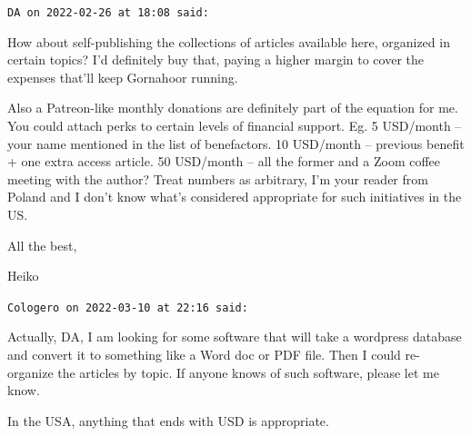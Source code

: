 \begin{footnotesize}
\begin{sffamily}
\hfill

\texttt{DA on 2022-02-26 at 18:08 said:}

How about self-publishing the collections of articles available here, organized in certain topics? I'd definitely buy that, paying a higher margin to cover the expenses that'll keep Gornahoor running.

Also a Patreon-like monthly donations are definitely part of the equation for me. You could attach perks to certain levels of financial support. Eg. 5 USD/month -- your name mentioned in the list of benefactors. 10 USD/month -- previous benefit + one extra access article. 50 USD/month -- all the former and a Zoom coffee meeting with the author? Treat numbers as arbitrary, I'm your reader from Poland and I don't know what's considered appropriate for such initiatives in the US.

All the best,

Heiko

\hfill

\texttt{Cologero on 2022-03-10 at 22:16 said:}

Actually, DA, I am looking for some software that will take a wordpress database and convert it to something like a Word doc or PDF file. Then I could re-organize the articles by topic. If anyone knows of such software, please let me know.

In the USA, anything that ends with USD is appropriate.

\end{sffamily}
\end{footnotesize}

